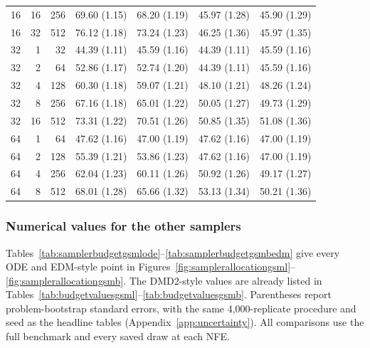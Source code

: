 \documentclass[11pt,letterpaper]{article}
\begin{document}
\begin{table}[!htbp]
\begin{tabular}{@{}rrr rrrr@{}}
16 & 16 & 256 & 69.60 {\scriptsize (1.15)} & 68.20 {\scriptsize (1.19)} & 45.97 {\scriptsize (1.28)} & 45.90 {\scriptsize (1.29)} \\
16 & 32 & 512 & 76.12 {\scriptsize (1.18)} & 73.24 {\scriptsize (1.23)} & 46.25 {\scriptsize (1.36)} & 45.97 {\scriptsize (1.35)} \\
\midrule
32 & 1 & 32 & 44.39 {\scriptsize (1.11)} & 45.59 {\scriptsize (1.16)} & 44.39 {\scriptsize (1.11)} & 45.59 {\scriptsize (1.16)} \\
32 & 2 & 64 & 52.86 {\scriptsize (1.17)} & 52.74 {\scriptsize (1.20)} & 44.39 {\scriptsize (1.11)} & 45.59 {\scriptsize (1.16)} \\
32 & 4 & 128 & 60.30 {\scriptsize (1.18)} & 59.07 {\scriptsize (1.21)} & 48.10 {\scriptsize (1.21)} & 48.26 {\scriptsize (1.24)} \\
32 & 8 & 256 & 67.16 {\scriptsize (1.18)} & 65.01 {\scriptsize (1.22)} & 50.05 {\scriptsize (1.27)} & 49.73 {\scriptsize (1.29)} \\
32 & 16 & 512 & 73.31 {\scriptsize (1.22)} & 70.51 {\scriptsize (1.26)} & 50.85 {\scriptsize (1.35)} & 51.08 {\scriptsize (1.36)} \\
\midrule
64 & 1 & 64 & 47.62 {\scriptsize (1.16)} & 47.00 {\scriptsize (1.19)} & 47.62 {\scriptsize (1.16)} & 47.00 {\scriptsize (1.19)} \\
64 & 2 & 128 & 55.39 {\scriptsize (1.21)} & 53.86 {\scriptsize (1.23)} & 47.62 {\scriptsize (1.16)} & 47.00 {\scriptsize (1.19)} \\
64 & 4 & 256 & 62.04 {\scriptsize (1.23)} & 60.11 {\scriptsize (1.26)} & 50.92 {\scriptsize (1.26)} & 49.17 {\scriptsize (1.27)} \\
64 & 8 & 512 & 68.01 {\scriptsize (1.28)} & 65.66 {\scriptsize (1.32)} & 53.13 {\scriptsize (1.34)} & 50.21 {\scriptsize (1.36)} \\
\bottomrule
\end{tabular}
\end{table}

\FloatBarrier
\subsubsection{Numerical values for the other samplers}
\label{app:samplerbudgetvalues}
Tables~\ref{tab:samplerbudgetgsmlode}--\ref{tab:samplerbudgetgsmbedm} give every ODE and EDM-style point in Figures~\ref{fig:samplerallocationgsml}--\ref{fig:samplerallocationgsmb}. The DMD2-style values are already listed in Tables~\ref{tab:budgetvaluesgsml}--\ref{tab:budgetvaluesgsmb}. Parentheses report problem-bootstrap standard errors, with the same 4,000-replicate procedure and seed as the headline tables (Appendix~\ref{app:uncertainty}). All comparisons use the full benchmark and every saved draw at each NFE.
\end{document}
